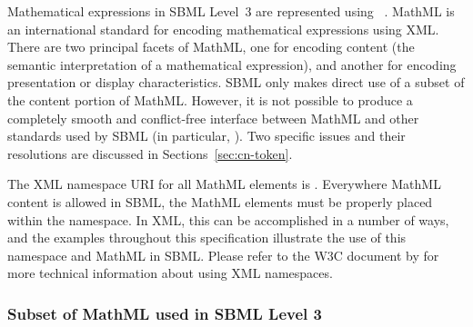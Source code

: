 Mathematical expressions in SBML Level~3 are represented using
\mathmltwo~\citep{w3c:2000b}.  MathML is an international standard
for encoding mathematical expressions using XML.  There are two
principal facets of MathML, one for encoding content (\ie the
semantic interpretation of a mathematical expression), and another
for encoding presentation or display characteristics.  SBML only
makes direct use of a subset of the content portion of MathML.
However, it is not possible to produce a completely smooth and
conflict-free interface between MathML and other standards used by
SBML (in particular, \xmlschema).  Two specific issues and their
resolutions are discussed in Sections~\ref{sec:cn-token}.

The XML namespace URI for all MathML elements is
.  Everywhere MathML
content is allowed in SBML, the MathML elements must be properly
placed within the \mathmltwo namespace.  In XML, this can be
accomplished in a number of ways, and the examples throughout this
specification illustrate the use of this namespace and MathML in
SBML.  Please refer to the W3C document by \citet{bray:1999} for
more technical information about using XML namespaces.


\subsubsection{Subset of MathML used in SBML Level 3}
\label{sec:mathmlsubset}


